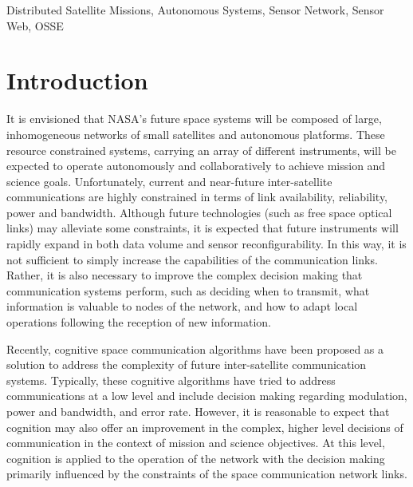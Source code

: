 \documentclass[conference]{IEEEtran}
\begin{document}
\begin{IEEEkeywords}
Distributed Satellite Missions, Autonomous Systems, Sensor Network, Sensor Web, OSSE
\end{IEEEkeywords}


\section{Introduction}
\label{sec:intro}

It is envisioned that NASA's future space systems will be composed of large,
inhomogeneous networks of small satellites and autonomous platforms.  These
resource constrained systems, carrying an array of different instruments, will
be expected to operate autonomously and collaboratively to achieve mission and
science goals.  Unfortunately, current and near-future inter-satellite
communications are highly constrained in terms of link availability,
reliability, power and bandwidth.  Although future technologies (such as free
space optical links) may alleviate some constraints, it is expected that future
instruments will rapidly expand in both data volume and sensor
reconfigurability.  In this way, it is not sufficient to simply increase the
capabilities of the communication links.  Rather, it is also necessary to
improve the complex decision making that communication systems perform, such as
deciding when to transmit, what information is valuable to nodes of the network,
and how to adapt local operations following the reception of new information.

Recently, cognitive space communication algorithms have been proposed as a
solution to address the complexity of future inter-satellite communication
systems.  Typically, these cognitive algorithms have tried to address
communications at a low level and include decision making regarding modulation,
power and bandwidth, and error rate.  However, it is reasonable to expect that
cognition may also offer an improvement in the complex, higher level decisions
of communication in the context of mission and science objectives.  At this
level, cognition is applied to the operation of the network with the decision
making primarily influenced by the constraints of the space communication
network links.
\end{document}
